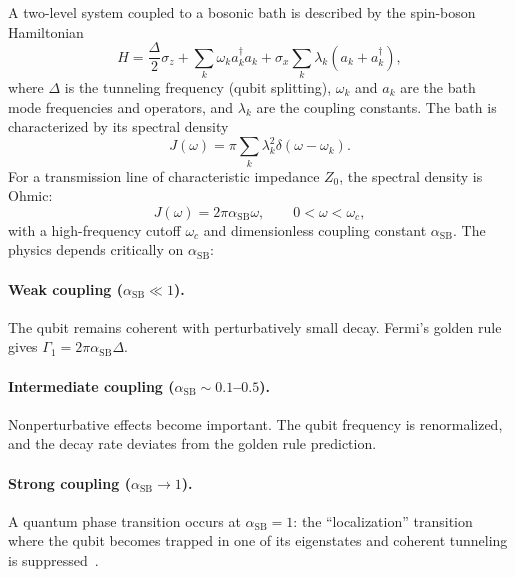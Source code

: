 \documentclass[reprint, floatfix, superscriptaddress, amsmath, amssymb, longbibliography]{revtex4-2}
\begin{document}
A two-level system coupled to a bosonic bath is described by the spin-boson Hamiltonian~\cite{Leggett1987, Weiss2012}
\begin{equation}
H = \frac{\Delta}{2}\sigma_z + \sum_k \omega_k a_k^\dagger a_k + \sigma_x \sum_k \lambda_k(a_k + a_k^\dagger),
\label{eq:spin_boson}
\end{equation}
where $\Delta$ is the tunneling frequency (qubit splitting), $\omega_k$ and $a_k$ are the bath mode frequencies and operators, and $\lambda_k$ are the coupling constants. The bath is characterized by its spectral density
\begin{equation}
J(\omega) = \pi \sum_k \lambda_k^2 \delta(\omega - \omega_k).
\label{eq:spectral_density}
\end{equation}
For a transmission line of characteristic impedance $Z_0$, the spectral density is Ohmic:
\begin{equation}
J(\omega) = 2\pi\alpha_{\mathrm{SB}} \omega, \qquad 0 < \omega < \omega_c,
\label{eq:ohmic}
\end{equation}
with a high-frequency cutoff $\omega_c$ and dimensionless coupling constant $\alpha_{\mathrm{SB}}$. The physics depends critically on $\alpha_{\mathrm{SB}}$:

\paragraph{Weak coupling ($\alpha_{\mathrm{SB}} \ll 1$).} The qubit remains coherent with perturbatively small decay. Fermi's golden rule gives $\Gamma_1 = 2\pi\alpha_{\mathrm{SB}}\Delta$.

\paragraph{Intermediate coupling ($\alpha_{\mathrm{SB}} \sim 0.1$--$0.5$).} Nonperturbative effects become important. The qubit frequency is renormalized, and the decay rate deviates from the golden rule prediction.

\paragraph{Strong coupling ($\alpha_{\mathrm{SB}} \to 1$).} A quantum phase transition occurs at $\alpha_{\mathrm{SB}} = 1$: the ``localization'' transition where the qubit becomes trapped in one of its eigenstates and coherent tunneling is suppressed~\cite{Leggett1987, Chakravarty1984}.

\end{document}
